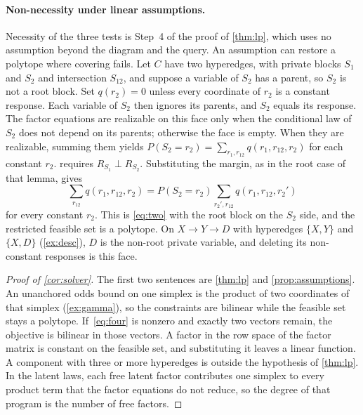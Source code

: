 \paragraph{Non-necessity under linear assumptions.}
Necessity of the three tests is Step~4 of the proof of \cref{thm:lp}, which uses no assumption beyond the diagram and the query. An assumption can restore a polytope where covering fails. Let $C$ have two hyperedges, with private blocks $S_1$ and $S_2$ and intersection $S_{12}$, and suppose a variable of $S_2$ has a parent, so $S_2$ is not a root block. Set $q(r_2)=0$ unless every coordinate of $r_2$ is a constant response. Each variable of $S_2$ then ignores its parents, and $S_2$ equals its response. The factor equations are realizable on this face only when the conditional law of $S_2$ does not depend on its parents; otherwise the face is empty. When they are realizable, summing them yields $P(S_2{=}r_2)=\sum_{r_1,r_{12}}q(r_1,r_{12},r_2)$ for each constant $r_2$.  requires $R_{S_1}\perp R_{S_2}$. Substituting the margin, as in the root case of that lemma, gives
\begin{equation}
\label{eq:const-face}
\sum_{r_{12}} q(r_1,r_{12},r_2)
=
P(S_2{=}r_2)\sum_{r_2',r_{12}} q(r_1,r_{12},r_2')
\end{equation}
for every constant $r_2$. This is \eqref{eq:two} with the root block on the $S_2$ side, and the restricted feasible set is a polytope. On $X\to Y\to D$ with hyperedges $\{X,Y\}$ and $\{X,D\}$ (\cref{ex:desc}), $D$ is the non-root private variable, and deleting its non-constant responses is this face.

\begin{proof}[Proof of \cref{cor:solver}]
The first two sentences are \cref{thm:lp} and \cref{prop:assumptions}. An unanchored odds bound on one simplex is the product of two coordinates of that simplex (\cref{ex:gamma}), so the constraints are bilinear while the feasible set stays a polytope. If~\eqref{eq:four} is nonzero and exactly two vectors remain, the objective is bilinear in those vectors. A factor in the row space of the factor matrix is constant on the feasible set, and substituting it leaves a linear function. A component with three or more hyperedges is outside the hypothesis of \cref{thm:lp}. In the latent laws, each free latent factor contributes one simplex to every product term that the factor equations do not reduce, so the degree of that program is the number of free factors.
\end{proof}


